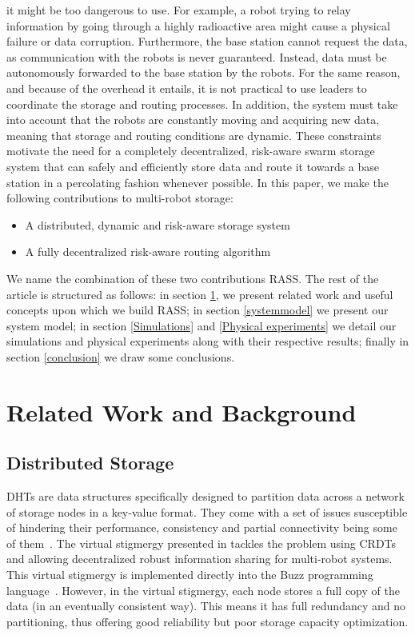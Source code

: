 it might be too dangerous to use. For example, a robot trying to relay
information by going through a highly radioactive area might cause a
physical failure or data corruption. Furthermore, the base station
cannot request the data, as communication with the robots is
never guaranteed. Instead, data must be autonomously forwarded to the base station
by the robots. For the same reason, and because of the overhead it
entails, it is not practical to use leaders to coordinate the storage
and routing processes. In addition, the system must take into account 
that the robots are constantly moving and acquiring new data,
meaning that storage and routing conditions are dynamic. These
constraints motivate the need for a completely decentralized,
risk-aware swarm storage system that can safely and efficiently store
data and route it towards a base station in a percolating fashion
whenever possible. In this paper, we make the following contributions
to multi-robot storage:

\begin{itemize}
    \item A distributed, dynamic and risk-aware storage system
    \item A fully decentralized risk-aware routing algorithm
\end{itemize}

We name the combination of these two contributions \ac{RASS}.
The rest of the article is structured as follows: in section \ref{relatedwork}, we
present related work and useful concepts upon which we build \ac{RASS}; in section \ref{systemmodel} we present our system model; in section \ref{Simulations} and \ref{Physical experiments} we
detail our simulations and physical experiments along with their respective results; finally in section \ref{conclusion} we
draw some conclusions.

\section{Related Work and Background}
\label{relatedwork}

\subsection{Distributed Storage}

\ac{DHT}s are data structures specifically
designed to partition data across a network of storage nodes in a
key-value format. They come with a set of issues susceptible of
hindering their performance, consistency and partial connectivity
being some of them~\cite{amigoni2017multirobot}. The virtual stigmergy
presented in \cite{pinciroliTuple2016} tackles the problem using
\ac{CRDT}s and allowing decentralized
robust information sharing for multi-robot systems. This virtual
stigmergy is implemented directly into the Buzz programming
language~\cite{pinciroliBuzz2016}. However, in the virtual stigmergy,
each node stores a full copy of the data (in an eventually consistent
way). This means it has full redundancy and no partitioning, thus
offering good reliability but poor storage capacity optimization.

